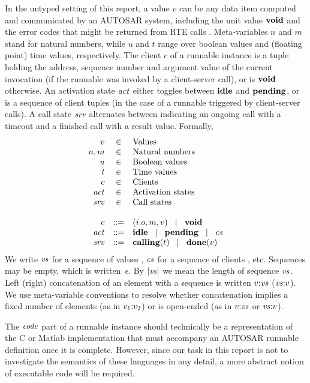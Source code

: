 \documentclass[10pt,conference]{IEEEtran}
\begin{document}
In the untyped setting of this report, a value $v$ can be any data item computed and communicated by an AUTOSAR system, including the unit value $\textbf{void}$ and the error codes that might be returned from RTE calls \cite[ch.~5.5.1]{AR:RTE}. Meta-variables $n$ and $m$ stand for natural numbers, while $u$ and $t$ range over boolean values and (floating point) time values, respectively. The client $c$ of a runnable instance is a tuple holding the address, sequence number and argument value of the current invocation (if the runnable was invoked by a client-server call), or is $\textbf{void}$ otherwise. An activation state $\Act$ either toggles between $\textbf{idle}$ and $\textbf{pending}$, or is a sequence of client tuples (in the case of a runnable triggered by client-server calls). A call state $\Srv$ alternates between indicating an ongoing call with a timeout and a finished call with a result value.
Formally,
\[
\begin{array}{rcll}
  v        & \in & \text{Values} \\
  n,m      & \in & \text{Natural numbers} \\
  u        & \in & \text{Boolean values} \\
  t        & \in & \text{Time values} \\
  c        & \in & \text{Clients} \\
  \Act     & \in & \text{Activation states} \\
  \Srv     & \in & \text{Call states} \\ \\
  c        & ::= & \Tclient {i.o} m v \sep \Tvoid \\
  \Act     & ::= & \Tidle \sep \Tpending \sep \Cs \\
  \Srv     & ::= & \Tcalling t \sep \Tdone v
\end{array}
\]
We write $\Vs$ for a sequence of values , $\Cs$ for a sequence of clients , etc. Sequences may be empty, which is written~$\epsilon$. By $\Tlength{\Vs}$ we mean the length of sequence $\Vs$. Left (right) concatenation of an element with a sequence is written $\Tcons v \Vs$ ($\Tsnoc \Vs v$). We use meta-variable conventions to resolve whether concatenation implies a fixed number of elements (as in $v_1{:}v_2$) or is open-ended (as in $\Tcons v \Vs$ or $\Tsnoc \Vs v$).

The $\Code$ part of a runnable instance should technically be a representation of the C or Matlab implementation that must accompany an AUTOSAR runnable definition once it is complete. However, since our task in this report is not to investigate the semantics of these languages in any detail, a more abstract notion of executable code will be required.
\end{document}
